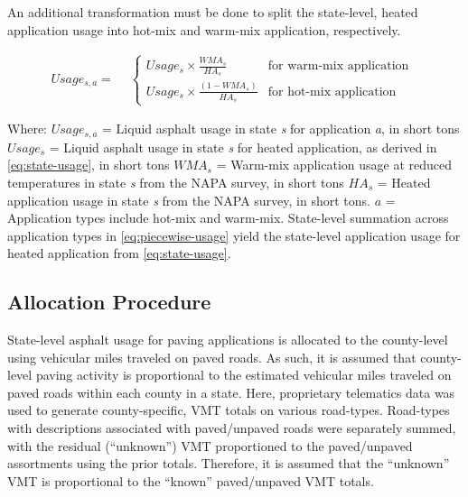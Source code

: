 \documentclass[
  11pt,
  oneside]{book}
\begin{document}
An additional transformation must be done to split the state-level, heated application usage into hot-mix and warm-mix application, respectively.

\begin{equation} 
  Usage_{s,a} = 
  \begin{aligned}
  &\begin{cases} 
    Usage_{s} \times \frac{WMA_{s}}{HA_{s}} & \text{for warm-mix application}\\ 
    Usage_{s} \times \frac{(1 - WMA_{s})}{HA_{s}} & \text{for hot-mix application }
  \end{cases}
  \end{aligned}
  \label{eq:piecewise-usage}
\end{equation}

Where: \newline
\(Usage_{s,a}\) = Liquid asphalt usage in state \emph{s} for application \emph{a}, in short tons \newline
\(Usage_{s}\) = Liquid asphalt usage in state \emph{s} for heated application, as derived in \eqref{eq:state-usage}, in short tons \newline
\(WMA_{s}\) = Warm-mix application usage at reduced temperatures in state \emph{s} from the NAPA survey, in short tons \newline
\(HA_{s}\) = Heated application usage in state \emph{s} from the NAPA survey, in short tons. \newline
\(a\) = Application types include hot-mix and warm-mix. State-level summation across application types in \eqref{eq:piecewise-usage} yield the state-level application usage for heated application from \eqref{eq:state-usage}. \newline

\subsection{Allocation Procedure}\label{allocation-procedure-1}

State-level asphalt usage for paving applications is allocated to the county-level using vehicular miles traveled on paved roads. As such, it is assumed that county-level paving activity is proportional to the estimated vehicular miles traveled on paved roads within each county in a state. Here, proprietary telematics data was used to generate county-specific, VMT totals on various road-types. Road-types with descriptions associated with paved/unpaved roads were separately summed, with the residual (``unknown'') VMT proportioned to the paved/unpaved assortments using the prior totals. Therefore, it is assumed that the ``unknown'' VMT is proportional to the ``known'' paved/unpaved VMT totals.
\end{document}
